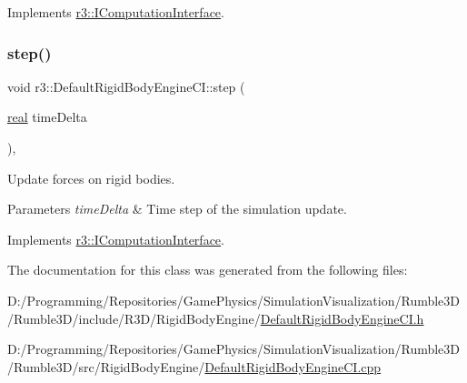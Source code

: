 Implements \mbox{\hyperlink{classr3_1_1_i_computation_interface_a6069989c54ffd4e714788d0968851007}{r3\+::\+I\+Computation\+Interface}}.

\mbox{\label{classr3_1_1_default_rigid_body_engine_c_i_ac45ae1d1889c75e6839b865870cbf59c}} 
\subsubsection{\texorpdfstring{step()}{step()}}
{\footnotesize\ttfamily void r3\+::\+Default\+Rigid\+Body\+Engine\+C\+I\+::step (\begin{DoxyParamCaption}\item[{\mbox{\hyperlink{namespacer3_ab2016b3e3f743fb735afce242f0dc1eb}{real}}}]{time\+Delta }\end{DoxyParamCaption})\hspace{0.3cm}{\ttfamily [override]}, {\ttfamily [virtual]}}



Update forces on rigid bodies. 


\begin{DoxyParams}{Parameters}
{\em time\+Delta} & Time step of the simulation update. \\
\hline
\end{DoxyParams}


Implements \mbox{\hyperlink{classr3_1_1_i_computation_interface_aaa12bcc35005f32a1984b38de97696cb}{r3\+::\+I\+Computation\+Interface}}.



The documentation for this class was generated from the following files\+:\begin{DoxyCompactItemize}
\item 
D\+:/\+Programming/\+Repositories/\+Game\+Physics/\+Simulation\+Visualization/\+Rumble3\+D/\+Rumble3\+D/include/\+R3\+D/\+Rigid\+Body\+Engine/\mbox{\hyperlink{_default_rigid_body_engine_c_i_8h}{Default\+Rigid\+Body\+Engine\+C\+I.\+h}}\item 
D\+:/\+Programming/\+Repositories/\+Game\+Physics/\+Simulation\+Visualization/\+Rumble3\+D/\+Rumble3\+D/src/\+Rigid\+Body\+Engine/\mbox{\hyperlink{_default_rigid_body_engine_c_i_8cpp}{Default\+Rigid\+Body\+Engine\+C\+I.\+cpp}}\end{DoxyCompactItemize}
